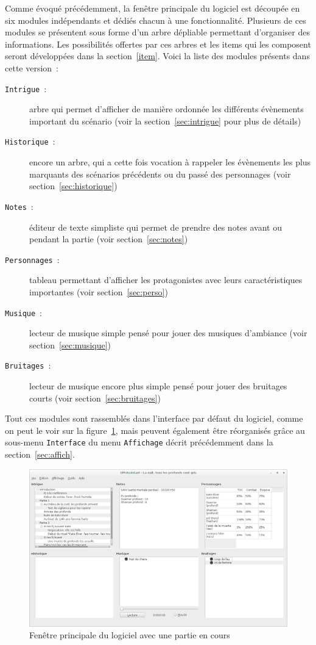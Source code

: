 \documentclass[a4paper,12pt]{article}
\newcommand*{\interfaceitem}[1]{\texttt{#1}}
\newcommand*{\guillemets}[1]{\og #1\fg{}\xspace}
\begin{document}
Comme évoqué précédemment, la fenêtre principale du logiciel est découpée en six modules indépendants et dédiés chacun à une fonctionnalité.
Plusieurs de ces modules se présentent sous forme d'un arbre \guillemets{dépliable} permettant d'organiser des informations.
Les possibilités offertes par ces arbres et les items qui les composent seront développées dans la section~\ref{item}.
Voici la liste des modules présents dans cette version~:
\begin{description}
    \item[\interfaceitem{Intrigue}~:]{arbre qui permet d'afficher de manière ordonnée les différents évènements important du scénario (voir la section~\ref{sec:intrigue} pour plus de détails)}
    \item[\interfaceitem{Historique}~:]{encore un arbre, qui a cette fois vocation à rappeler les évènements les plus marquants des scénarios précédents ou du passé des personnages (voir section~\ref{sec:historique})}
    \item[\interfaceitem{Notes}~:]{éditeur de texte simpliste qui permet de prendre des notes avant ou pendant la partie (voir section~\ref{sec:notes})}
    \item[\interfaceitem{Personnages}~:]{tableau permettant d'afficher les protagonistes avec leurs caractéristiques importantes (voir section~\ref{sec:perso})}
    \item[\interfaceitem{Musique}~:]{lecteur de musique simple pensé pour jouer des musiques d'ambiance (voir section~\ref{sec:musique})}
    \item[\interfaceitem{Bruitages}~:]{lecteur de musique encore plus simple pensé pour jouer des bruitages courts (voir section~\ref{sec:bruitages})}
\end{description}
Tout ces modules sont rassemblés dans l'interface par défaut du logiciel, comme on peut le voir sur la figure~\ref{fig:interface}, mais peuvent également être réorganisés grâce au sous-menu \interfaceitem{Interface} du menu \interfaceitem{Affichage} décrit précédemment dans la section~\ref{sec:affich}.
\begin{figure}[ht]
    \centerline{\includegraphics[width=\textwidth]{scenario_complet}}
    \caption{Fenêtre principale du logiciel avec une partie en cours}
    \label{fig:interface}
\end{figure}
\end{document}
